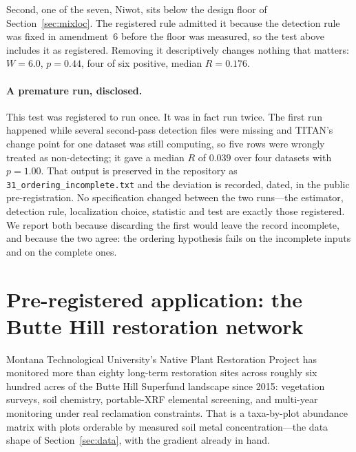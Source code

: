 \documentclass[review,12pt,authoryear]{elsarticle}
\theoremstyle{remark}
\begin{document}
Second, one of the seven, Niwot, sits below the design floor of
Section~\ref{sec:mixloc}. The registered rule admitted it because the
detection rule was fixed in amendment~6 before the floor was measured, so
the test above includes it as registered. Removing it descriptively changes
nothing that matters: $W = 6.0$, $p = 0.44$, four of six positive, median
$R = 0.176$.

\paragraph{A premature run, disclosed.} This test was registered to run
once. It was in fact run twice. The first run happened while several
second-pass detection files were missing and TITAN's change point for one
dataset was still computing, so five rows were wrongly treated as
non-detecting; it gave a median $R$ of $0.039$ over four datasets with
$p = 1.00$. That output is preserved in the repository as
\texttt{31\_ordering\_incomplete.txt} and the deviation is recorded, dated,
in the public pre-registration. No specification changed between the two
runs---the estimator, detection rule, localization choice, statistic and
test are exactly those registered. We report both because discarding the
first would leave the record incomplete, and because the two agree: the
ordering hypothesis fails on the incomplete inputs and on the complete ones.

\section{Pre-registered application: the Butte Hill restoration network}
\label{sec:butte}

Montana Technological University's Native Plant Restoration Project has
monitored more than eighty long-term restoration sites across roughly six
hundred acres of the Butte Hill Superfund landscape since 2015: vegetation
surveys, soil chemistry, portable-XRF elemental screening, and multi-year
monitoring under real reclamation constraints. That is a taxa-by-plot
abundance matrix with plots orderable by measured soil metal concentration---the data shape of Section~\ref{sec:data}, with the gradient already in hand.
\end{document}
